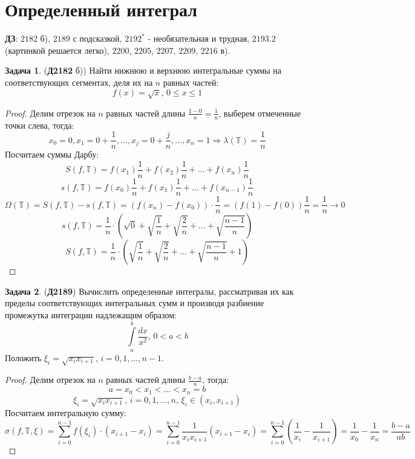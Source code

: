 \documentclass[12pt]{article}
\newcommand{\RN}[1]{%
	\textup{\uppercase\expandafter{\romannumeral#1}}%
}
\newcommand{\MTB}{\mathbb{T}}
\theoremstyle{definition}
\newtheorem{problem}{Задача}
\newcommand{\ddsum}[2]{\displaystyle\sum\limits_{#1}^{#2}}
\newcommand{\ddint}[2]{\displaystyle\int\limits_{#1}^{#2}}
\begin{document}
\lhead{Математический анализ - \RN{2}}

\section*{Определенный интеграл}

\textbf{ДЗ}: $2182$ б), $2189$ с подсказкой, $2192^*$ - необязательная и трудная, $2193.2$ (картинкой решается легко), $2200$, $2205$, $2207$, $2209$, $2216$ в).

\begin{problem}(\textbf{Д2182} б))
	Найти нижнюю и верхнюю интегральные суммы на соответствующих сегментах, деля их на $n$ равных частей:
	$$
		f(x) = \sqrt{x}, \, 0 \leq x \leq 1
	$$
\end{problem}

\begin{proof}
	Делим отрезок на $n$ равных частей длины $\tfrac{1 - 0}{n} = \tfrac{1}{n}$, выберем отмеченные точки слева, тогда:
	$$
		x_0 = 0, x_1 = 0 + \dfrac{1}{n}, \dotsc, x_j = 0 + \dfrac{j}{n}, \dotsc, x_n = 1 \Rightarrow \lambda(\MTB) = \dfrac{1}{n}
	$$
	Посчитаем суммы Дарбу:
	$$
		S(f,\MTB) = f(x_1)\dfrac{1}{n} + f(x_2)\dfrac{1}{n} + \dotsc + f(x_n)\dfrac{1}{n}		
	$$
	$$
		s(f,\MTB) = f(x_0)\dfrac{1}{n} + f(x_1)\dfrac{1}{n} + \dotsc + f(x_{n-1})\dfrac{1}{n}		
	$$
	$$
		\Omega(\MTB) = S(f,\MTB) - s(f,\MTB) = (f(x_n) - f(x_0)){\cdot}\dfrac{1}{n} = (f(1) - f(0))\dfrac{1}{n} = \dfrac{1}{n} \to 0
	$$
	$$
		s(f,\MTB) = \dfrac{1}{n}{\cdot}\left(\sqrt{0} + \sqrt{\dfrac{1}{n}} + \sqrt{\dfrac{2}{n}} + \dotsc + \sqrt{\dfrac{n-1}{n}}\right)
	$$
	$$
		S(f,\MTB) = \dfrac{1}{n}{\cdot}\left(\sqrt{\dfrac{1}{n}} + \sqrt{\dfrac{2}{n}} + \dotsc + \sqrt{\dfrac{n-1}{n}} + 1\right)
	$$
\end{proof}

\begin{problem}(\textbf{Д2189})
	Вычислить определенные интегралы, рассматривая их как пределы соответствующих интегральных сумм и производя разбиение промежутка интеграции надлежащим образом:
	$$
		\ddint{a}{b}\dfrac{dx}{x^2}, \, 0 < a < b
	$$
	Положить $\xi_i = \sqrt{x_i x_{i+1}}, \, i = 0,1, \dotsc, n-1$.
\end{problem}
\begin{proof}
	Делим отрезок на $n$ равных частей длины $\tfrac{b - a}{n}$, тогда:
	$$
		a = x_0 < x_1 < \dotsc < x_n = b
	$$
	$$
		\xi_i = \sqrt{x_i x_{i+1}}, \, i = 0, 1 , \dotsc, n, \, \xi_i \in (x_i, x_{i+1})
	$$
	Посчитаем интегральную сумму:
	$$
		\sigma(f,\MTB, \xi) = \ddsum{i = 0}{n-1}f(\xi_i){\cdot}(x_{i + 1} - x_{i}) = \ddsum{i = 0}{n-1}\dfrac{1}{x_i x_{i+1}}(x_{i+1} - x_i) = \ddsum{i = 0}{n-1}\left(\dfrac{1}{x_i} - \dfrac{1}{x_{i+1}}\right) = \dfrac{1}{x_0} - \dfrac{1}{x_{n}} = \dfrac{b - a}{ab}
	$$
\end{proof}
\newpage
\end{document}
